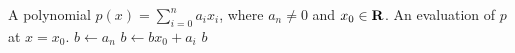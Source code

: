 
\begin{algorithmic}[1]
\Require A polynomial $p(x) = \sum_{i=0}^n a_i x_i$, where $a_n \neq 0$
  and $x_0 \in \mathbf{R}$.
\Ensure An evaluation of $p$ at $x = x_0$.
\State $b \gets a_n$
  \State $b \gets b x_0 + a_i$
\EndFor
\State \Return $b$
\end{algorithmic}
